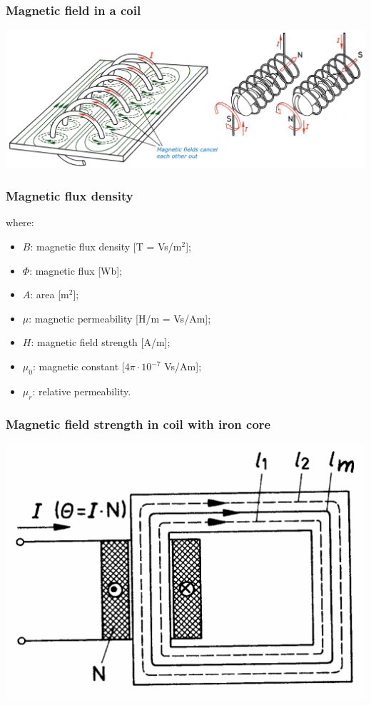 \documentclass{article}
\begin{document}
\subsubsection{Magnetic field in a coil}
\begin{center}
    \includegraphics[width=\textwidth]{media/magneticfield_coil.png}
\end{center}

\newpage
\subsubsection{Magnetic flux density}

where:
\begin{itemize}
    \item $B$: magnetic flux density [T = Vs/m$^2$];
    \item $\Phi$: magnetic flux [Wb];
    \item $A$: area [m$^2$];
    \item $\mu$: magnetic permeability [H/m = Vs/Am];
    \item $H$: magnetic field strength [A/m];
    \item $\mu_0$: magnetic constant [$4\pi\cdot 10^{-7}$ Vs/Am];
    \item $\mu_r$: relative permeability.
\end{itemize}


\subsubsection{Magnetic field strength in coil with iron core}

\begin{center}
    \includegraphics[width=.4\textwidth]{media/strength_iron_core.png}
\end{center}
\end{document}
